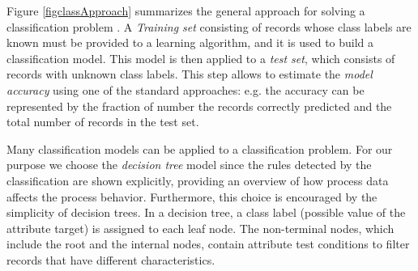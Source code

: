 \documentclass{llncs}
\begin{document}
Figure \ref{figclassApproach} summarizes the general approach for
solving a classification problem \cite{5}. A \emph{Training set}
consisting of records whose class labels are known must be provided to
a learning algorithm, and it is used to build a classification
model. This model is then applied to a \emph{test set}, which consists
of records with unknown class labels.
This step allows to  estimate the \emph{model accuracy} using one of
the standard approaches: e.g. the accuracy can be represented by the
fraction of number the records correctly predicted and the total number of records in the test set.

Many classification models can be applied to a classification
problem. For our purpose we choose the \emph{decision tree} model
since the rules detected by the classification are shown explicitly,
providing an overview of how process data affects the
process behavior. Furthermore, this choice is encouraged by the simplicity of decision trees. In a decision tree, a class label (possible value of the attribute target) is assigned to each leaf node. The non-terminal nodes, which include the root and the internal nodes, contain attribute test conditions to filter records that have different characteristics.

\end{document}
